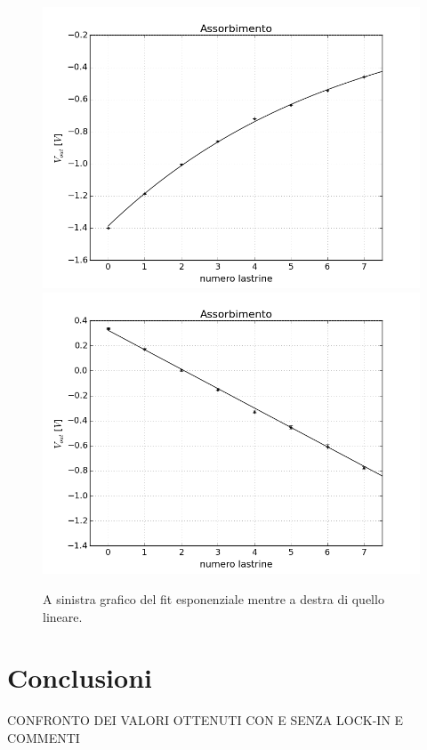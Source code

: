 \documentclass[10pt,a4paper]{article}
\begin{document}
\begin{figure}[!htb]
  \centering
  \includegraphics[scale=0.45]{plot-exp2.png}\includegraphics[scale=0.45]{plot-lin2.png}
\caption{A sinistra grafico del fit esponenziale mentre a destra di quello lineare.\label{plot2}}
\end{figure}

\section{Conclusioni}

CONFRONTO DEI VALORI OTTENUTI CON E SENZA LOCK-IN E COMMENTI
 
\end{document}
